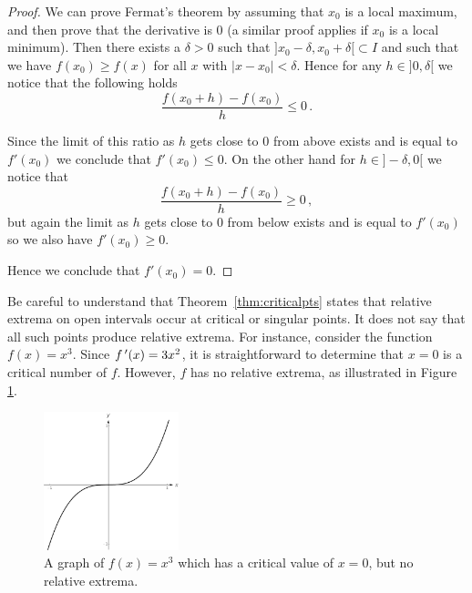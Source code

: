 \begin{proof}
We can prove Fermat's theorem by assuming that $x_{0}$ is a local maximum, and then prove that the derivative is 0 (a similar proof applies if $x_{0}$ is a local minimum). Then there exists a $\delta >0$ such that $]x_{0}-\delta ,x_{0}+\delta[\subset I$ and such that we have $f(x_{0})\geq f(x)$ for all $x$ with $ |x-x_{0}|<\delta$. Hence for any $h\in ]0,\delta[$ we notice that the following holds
$$
\displaystyle {\frac {f(x_{0}+h)-f(x_{0})}{h}}\leq 0\,.
$$

Since the limit of this ratio as $h$ gets close to 0 from above exists and is equal to $f'(x_{0})$  we conclude that $f'(x_{0})\leq 0$. On the other hand for $ h\in ]-\delta ,0[$ we notice that
$$
{\displaystyle {\frac {f(x_{0}+h)-f(x_{0})}{h}}\geq 0\,,}
$$
but again the limit as $h$ gets close to 0 from below exists and is equal to $f'(x_{0})$ so we also have $f'(x_{0})\geq 0$.

Hence we conclude that $f'(x_{0})=0$.
\end{proof}

\fi

Be careful to understand that Theorem~\ref{thm:criticalpts} states that relative extrema on open intervals occur at critical or singular points. It does not say that all such points produce relative extrema. For instance, consider the function $f(x) = x^3$. Since $f\,'(x) = 3x^2$, it is straightforward to determine that $x=0$ is a critical number of $f$. However, $f$ has no relative extrema, as illustrated in Figure \ref{fig_behaviour_3}. 

\begin{figure}
	\begin{center}
			\includegraphics[width=0.35\textwidth]{fig_behaviour_3}
	\caption{A graph of $f(x)=x^3$ which has a critical value of $x=0$, but no relative extrema.}
	\label{fig_behaviour_3}
	\end{center}
\end{figure}


